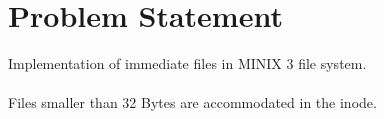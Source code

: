 \chapter{Problem Statement}

\vspace{10mm}

Implementation of immediate files in MINIX 3 file system.\\ \\Files smaller than 32 Bytes are accommodated in the inode.


